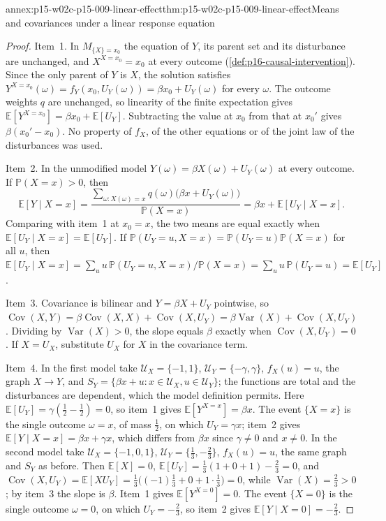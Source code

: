 \begin{annexitem}{annex:p15-w02c-p15-009-linear-effect}{thm:p15-w02c-p15-009-linear-effect}{Means and covariances under a linear response equation}
\begin{proof}
Item~1. In \(M_{\{X\}=x_0}\) the equation of \(Y\), its parent set and
its disturbance are unchanged, and \(X^{X=x_0}=x_0\) at every outcome
(\cref{def:p16-causal-intervention}). Since the only parent of \(Y\) is
\(X\), the solution satisfies
\(Y^{X=x_0}(\omega)=f_Y(x_0,U_Y(\omega))=\beta x_0+U_Y(\omega)\) for
every \(\omega\). The outcome weights \(q\) are unchanged, so linearity
of the finite expectation gives
\(\mathbb E[Y^{X=x_0}]=\beta x_0+\mathbb E[U_Y]\). Subtracting the value
at \(x_0\) from that at \(x_0'\) gives \(\beta(x_0'-x_0)\). No property
of \(f_X\), of the other equations or of the joint law of the
disturbances was used.

Item~2. In the unmodified model \(Y(\omega)=\beta X(\omega)+U_Y(\omega)\)
at every outcome. If \(\mathbb P(X=x)>0\), then
\[
 \mathbb E[Y\mid X=x]
 =\frac{\sum_{\omega:X(\omega)=x}q(\omega)\bigl(\beta x+U_Y(\omega)\bigr)}
       {\mathbb P(X=x)}
 =\beta x+\mathbb E[U_Y\mid X=x].
\]
Comparing with item~1 at \(x_0=x\), the two means are equal exactly when
\(\mathbb E[U_Y\mid X=x]=\mathbb E[U_Y]\). If
\(\mathbb P(U_Y=u,X=x)=\mathbb P(U_Y=u)\mathbb P(X=x)\) for all \(u\),
then
\(\mathbb E[U_Y\mid X=x]=\sum_uu\,\mathbb P(U_Y=u,X=x)/\mathbb P(X=x)
=\sum_uu\,\mathbb P(U_Y=u)=\mathbb E[U_Y]\).

Item~3. Covariance is bilinear and \(Y=\beta X+U_Y\) pointwise, so
\(\operatorname{Cov}(X,Y)=\beta\operatorname{Cov}(X,X)
+\operatorname{Cov}(X,U_Y)=\beta\operatorname{Var}(X)
+\operatorname{Cov}(X,U_Y)\). Dividing by \(\operatorname{Var}(X)>0\),
the slope equals \(\beta\) exactly when \(\operatorname{Cov}(X,U_Y)=0\).
If \(X=U_X\), substitute \(U_X\) for \(X\) in the covariance term.

Item~4. In the first model take \(\mathcal U_X=\{-1,1\}\),
\(\mathcal U_Y=\{-\gamma,\gamma\}\), \(f_X(u)=u\), the graph \(X\to Y\),
and \(S_Y=\{\beta x+u:x\in\mathcal U_X,u\in\mathcal U_Y\}\); the
functions are total and the disturbances are dependent, which the model
definition permits. Here \(\mathbb E[U_Y]=\gamma(\tfrac12-\tfrac12)=0\),
so item~1 gives \(\mathbb E[Y^{X=x}]=\beta x\). The event \(\{X=x\}\) is
the single outcome \(\omega=x\), of mass \(\tfrac12\), on which
\(U_Y=\gamma x\); item~2 gives
\(\mathbb E[Y\mid X=x]=\beta x+\gamma x\), which differs from \(\beta x\)
since \(\gamma\ne0\) and \(x\ne0\).
In the second model take \(\mathcal U_X=\{-1,0,1\}\),
\(\mathcal U_Y=\{\tfrac13,-\tfrac23\}\), \(f_X(u)=u\), the same graph and
\(S_Y\) as before. Then \(\mathbb E[X]=0\),
\(\mathbb E[U_Y]=\tfrac13(1+0+1)-\tfrac23=0\), and
\(\operatorname{Cov}(X,U_Y)=\mathbb E[XU_Y]
=\tfrac13\bigl((-1)\tfrac13+0+1\cdot\tfrac13\bigr)=0\), while
\(\operatorname{Var}(X)=\tfrac23>0\); by item~3 the slope is \(\beta\).
Item~1 gives \(\mathbb E[Y^{X=0}]=0\). The event \(\{X=0\}\) is the
single outcome \(\omega=0\), on which \(U_Y=-\tfrac23\), so item~2 gives
\(\mathbb E[Y\mid X=0]=-\tfrac23\).


\end{proof}
\end{annexitem}
